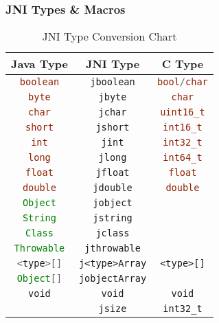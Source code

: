 \documentclass[10pt,mathserif]{beamer}
\begin{document}
	\begin{frame}
		\frametitle{JNI Types \& Macros}

		\begin{table}
			\begin{minipage}{\textwidth}
				\centering
				\begin{tabular}{|c|c|c|}
					\hline
					{\bfseries Java Type} & {\bfseries JNI Type} & {\bfseries C Type} \\ \hline
					\lstinline[language=java]{boolean} & \lstinline{jboolean} & \lstinline[language=c]{bool/char} \\
					\lstinline[language=java]{byte} & \lstinline{jbyte} & \lstinline[language=c]{char} \\
					\lstinline[language=java]{char} & \lstinline{jchar} & \lstinline[language=c]{uint16_t} \\
					\lstinline[language=java]{short} & \lstinline{jshort} & \lstinline[language=c]{int16_t} \\
					\lstinline[language=java]{int} & \lstinline{jint} & \lstinline[language=c]{int32_t} \\
					\lstinline[language=java]{long} & \lstinline{jlong} & \lstinline[language=c]{int64_t} \\
					\lstinline[language=java]{float} & \lstinline{jfloat} & \lstinline[language=c]{float} \\
					\lstinline[language=java]{double} & \lstinline{jdouble} & \lstinline[language=c]{double} \\
					\lstinline[language=java]{Object} & \lstinline{jobject} & \\
					\lstinline[language=java]{String} & \lstinline{jstring} & \\
					\lstinline[language=java]{Class} & \lstinline{jclass} & \\
					\lstinline[language=java]{Throwable} & \lstinline{jthrowable} & \\
					\lstinline[language=java]{<type>[]} & \lstinline{j<type>Array} & \lstinline{<type>[]} \\
					\lstinline[language=java]{Object[]} & \lstinline{jobjectArray} & \\
					\lstinline{void} & \lstinline{void} & \lstinline{void} \\
					 & \lstinline{jsize} & \lstinline{int32_t} \\
					\hline
				\end{tabular}
				\caption{JNI Type Conversion Chart}
			\end{minipage}
		\end{table}
	\end{frame}
\end{document}
